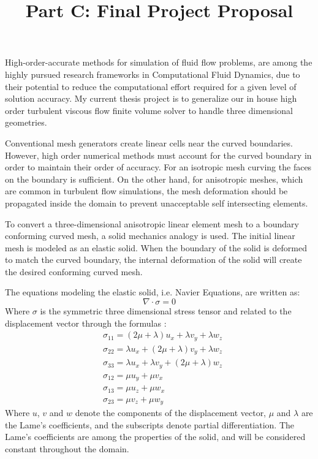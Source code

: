 \documentclass[letter,12pt]{article}
\title{Part C: Final Project Proposal \vspace{-3ex}}
\date{}
\author{}
\begin{document}
\maketitle
{}


High-order-accurate methods for simulation of fluid flow problems, are
among the highly pursued research frameworks in Computational Fluid
Dynamics, due to their potential to reduce the computational effort
required for a given level of solution accuracy. My
current thesis project is to generalize our in house high order
turbulent viscous flow finite volume solver\cite{jalali} to handle
three dimensional geometries.

Conventional mesh generators create linear cells near the curved
boundaries. However, high order numerical methods must account for the
curved boundary in order to maintain their order of accuracy. For an
isotropic mesh curving the faces on the boundary is sufficient. On the
other hand, for anisotropic meshes, which are common in turbulent flow
simulations, the mesh deformation should be propagated inside the
domain to prevent unacceptable self intersecting elements.

To convert a three-dimensional anisotropic linear element mesh to a
boundary conforming curved mesh, a solid mechanics analogy is
used. The initial linear mesh is modeled as an elastic solid. When the
boundary of the solid is deformed to match the curved boundary, the
internal deformation of the solid will create the desired conforming
curved mesh.


The equations modeling the elastic solid, i.e. Navier Equations, are 
written as\cite{lai}:
%
\[
\nabla \cdot \sigma = 0
\]
%
Where $\sigma$ is the symmetric three dimensional stress tensor and
related to the displacement vector through the formulas :
%
\begin{align*}
& \sigma_{11} = (2 \mu + \lambda) u_x + \lambda v_y +  \lambda w_z \\
& \sigma_{22} = \lambda u_x + (2 \mu + \lambda) v_y +  \lambda w_z \\
& \sigma_{33} = \lambda u_x + \lambda v_y +  (2 \mu + \lambda) w_z \\
& \sigma_{12} = \mu u_y + \mu v_x \\
& \sigma_{13} = \mu u_z + \mu w_x \\
& \sigma_{23} = \mu v_z + \mu w_y
\end{align*}
%
Where $u$, $v$ and $w$ denote the components of the displacement
vector, $\mu$ and $\lambda$ are the Lame's coefficients, and the
subscripts denote partial differentiation. The Lame's coefficients are
among the properties of the solid, and will be considered constant
throughout the domain.
\end{document}
